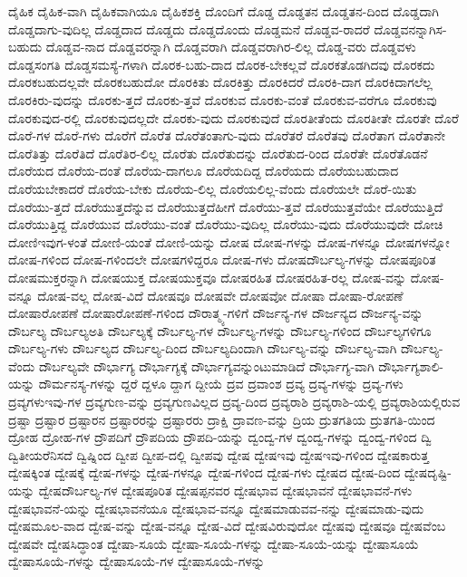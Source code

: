 {ದೈಹಿಕ
ದೈಹಿಕ-ವಾಗಿ
ದೈಹಿಕವಾಗಿಯೂ
ದೈಹಿಕಶಕ್ತಿ
ದೊಂದಿಗೆ
ದೊಡ್ಡ
ದೊಡ್ಡತನ
ದೊಡ್ಡತನ-ದಿಂದ
ದೊಡ್ಡದಾಗಿ
ದೊಡ್ಡದಾಗು-ವುದಿಲ್ಲ
ದೊಡ್ಡದಾದ
ದೊಡ್ಡದು
ದೊಡ್ಡದೊಂದು
ದೊಡ್ಡಮನೆ
ದೊಡ್ಡವ-ರಾದರೆ
ದೊಡ್ಡವನನ್ನಾಗಿಸ-ಬಹುದು
ದೊಡ್ಡವ-ನಾದ
ದೊಡ್ಡವರನ್ನಾಗಿ
ದೊಡ್ಡವರಾಗಿ
ದೊಡ್ಡವರಾಗಿರ-ಲಿಲ್ಲ
ದೊಡ್ಡ-ವರು
ದೊಡ್ಡವಳು
ದೊಡ್ಡಸಂಗತಿ
ದೊಡ್ಡಸಮಸ್ಯೆ-ಗಳಾಗಿ
ದೊರಕ-ಬಹು-ದಾದ
ದೊರಕ-ಬೇಕಲ್ಲವೆ
ದೊರಕತೊಡಗಿದವು
ದೊರಕದು
ದೊರಕಬಹುದಲ್ಲವೇ
ದೊರಕಬಹುದೋ
ದೊರಕಿತು
ದೊರಕಿತ್ತು
ದೊರಕಿದರೆ
ದೊರಕಿ-ದಾಗ
ದೊರಕಿದಾಗಲೆಲ್ಲ
ದೊರಕಿರು-ವುದನ್ನು
ದೊರಕು-ತ್ತದೆ
ದೊರಕು-ತ್ತವೆ
ದೊರಕುವ
ದೊರಕು-ವಂತೆ
ದೊರಕುವ-ವರೆಗೂ
ದೊರಕುವು
ದೊರಕುವುದ-ರಲ್ಲಿ
ದೊರಕುವುದಲ್ಲದೇ
ದೊರಕು-ವುದು
ದೊರಕುವುದೆ
ದೊರತೀತೆಂದು
ದೊರತೀತೇ
ದೊರತೇ
ದೊರೆ
ದೊರೆ-ಗಳ
ದೊರೆ-ಗಳು
ದೊರೆಗೆ
ದೊರೆತ
ದೊರೆತಂತಾಗು-ವುದು
ದೊರೆತರೆ
ದೊರೆತವು
ದೊರೆತಾಗ
ದೊರೆತಾನೇ
ದೊರೆತಿತ್ತು
ದೊರೆತಿದೆ
ದೊರೆತಿರ-ಲಿಲ್ಲ
ದೊರೆತು
ದೊರೆತುದನ್ನು
ದೊರೆತುದ-ರಿಂದ
ದೊರೆತೇ
ದೊರೆತೊಡನೆ
ದೊರೆಯದ
ದೊರೆಯ-ದಂತೆ
ದೊರೆಯ-ದಾಗಲೂ
ದೊರೆಯದಿದ್ದ
ದೊರೆಯದು
ದೊರೆಯಬಹುದಾದ
ದೊರೆಯಬೇಕಾದರೆ
ದೊರೆಯ-ಬೇಕು
ದೊರೆಯ-ಲಿಲ್ಲ
ದೊರೆಯಲಿಲ್ಲ-ವೆಂದು
ದೊರೆಯಲೇ
ದೊರೆ-ಯಿತು
ದೊರೆಯು-ತ್ತದೆ
ದೊರೆಯುತ್ತದೆನ್ನುವ
ದೊರೆಯುತ್ತದೆಹೀಗೆ
ದೊರೆಯು-ತ್ತವೆ
ದೊರೆಯುತ್ತವೆಯೇ
ದೊರೆಯುತ್ತಿದೆ
ದೊರೆಯುತ್ತಿದ್ದ
ದೊರೆಯುವ
ದೊರೆಯು-ವಂತೆ
ದೊರೆಯು-ವುದಿಲ್ಲ
ದೊರೆಯು-ವುದು
ದೊರೆಯುವುದೇ
ದೋಚಿ
ದೋಣಿಇವುಗ-ಳಂತೆ
ದೋಣಿ-ಯಂತೆ
ದೋಣಿ-ಯನ್ನು
ದೋಷ
ದೋಷ-ಗಳನ್ನು
ದೋಷ-ಗಳನ್ನೂ
ದೋಷಗಳನ್ನೋ
ದೋಷ-ಗಳಿಂದ
ದೋಷ-ಗಳಿಂದಲೇ
ದೋಷಗಳಿದ್ದರೂ
ದೋಷ-ಗಳು
ದೋಷದೌರ್ಬಲ್ಯ-ಗಳನ್ನು
ದೋಷಪೂರಿತ
ದೋಷಮುಕ್ತರನ್ನಾಗಿ
ದೋಷಯುಕ್ತ
ದೋಷಯುಕ್ತವೂ
ದೋಷರಹಿತ
ದೋಷರಹಿತ-ರಲ್ಲ
ದೋಷ-ವನ್ನು
ದೋಷ-ವನ್ನೂ
ದೋಷ-ವಲ್ಲ
ದೋಷ-ವಿದೆ
ದೋಷವೂ
ದೋಷವೇ
ದೋಷವೋ
ದೋಷಾ
ದೋಷಾ-ರೋಪಣೆ
ದೋಷಾರೋಪಣೆ
ದೋಷಾರೋಪಣೆ-ಗಳಿಂದ
ದೌರಾತ್ಮ್ಯ-ಗಳಿಗೆ
ದೌರ್ಜನ್ಯ-ಗಳ
ದೌರ್ಜನ್ಯದ
ದೌರ್ಜನ್ಯ-ವನ್ನು
ದೌರ್ಬಲ್ಯ
ದೌರ್ಬಲ್ಯಅತಿ
ದೌರ್ಬಲ್ಯಕ್ಕೆ
ದೌರ್ಬಲ್ಯ-ಗಳ
ದೌರ್ಬಲ್ಯ-ಗಳನ್ನು
ದೌರ್ಬಲ್ಯ-ಗಳಿಂದ
ದೌರ್ಬಲ್ಯಗಳಿಗೂ
ದೌರ್ಬಲ್ಯ-ಗಳು
ದೌರ್ಬಲ್ಯದ
ದೌರ್ಬಲ್ಯ-ದಿಂದ
ದೌರ್ಬಲ್ಯದಿಂದಾಗಿ
ದೌರ್ಬಲ್ಯ-ವನ್ನು
ದೌರ್ಬಲ್ಯ-ವಾಗಿ
ದೌರ್ಬಲ್ಯ-ವೆಂದು
ದೌರ್ಬಲ್ಯವೇ
ದೌರ್ಭಾಗ್ಯ
ದೌರ್ಭಾಗ್ಯಕ್ಕೆ
ದೌರ್ಭಾಗ್ಯವನ್ನುಂಟುಮಾಡಿದೆ
ದೌರ್ಭಾಗ್ಯ-ವಾಗಿ
ದೌರ್ಭಾಗ್ಯಶಾಲಿ-ಯನ್ನು
ದೌರ್ಮನಸ್ಯ-ಗಳನ್ನು
ದ್ದರೆ
ದ್ದಳೂ
ದ್ದಾಗ
ದ್ದೀಯೆ
ದ್ರವ
ದ್ರವಾಂಶ
ದ್ರವ್ಯ
ದ್ರವ್ಯ-ಗಳನ್ನು
ದ್ರವ್ಯ-ಗಳು
ದ್ರವ್ಯಗಳುಇವು-ಗಳ
ದ್ರವ್ಯಗುಣ-ವನ್ನು
ದ್ರವ್ಯಗುಣವಿಲ್ಲದ
ದ್ರವ್ಯ-ದಿಂದ
ದ್ರವ್ಯರಾಶಿ
ದ್ರವ್ಯರಾಶಿ-ಯಲ್ಲಿ
ದ್ರವ್ಯರಾಶಿಯಲ್ಲಿರುವ
ದ್ರಷ್ಟಾ
ದ್ರಷ್ಟಾರ
ದ್ರಷ್ಟಾರನ
ದ್ರಷ್ಟಾರರನ್ನು
ದ್ರಷ್ಟಾರರು
ದ್ರಾಕ್ಷಿ
ದ್ರಾವಣ-ವನ್ನು
ದ್ರಿಯ
ದ್ರುತಗತಿಯ
ದ್ರುತಗತಿ-ಯಿಂದ
ದ್ರೋಹ
ದ್ರೋಹ-ಗಳ
ದ್ರೌಪದಿಗೆ
ದ್ರೌಪದಿಯ
ದ್ರೌಪದಿ-ಯನ್ನು
ದ್ವಂದ್ವ-ಗಳ
ದ್ವಂದ್ವ-ಗಳನ್ನು
ದ್ವಂದ್ವ-ಗಳಿಂದ
ದ್ವಿ
ದ್ವಿತೀಯರೆನಿಸದೆ
ದ್ವಿಷ್ನಿಂದ
ದ್ವೀಪ
ದ್ವೀಪ-ದಲ್ಲಿ
ದ್ವೀಪವು
ದ್ವೇಷ
ದ್ವೇಷಇವು
ದ್ವೇಷಇವು-ಗಳಿಂದ
ದ್ವೇಷಕಾರುತ್ತ
ದ್ವೇಷಕ್ಕಿಂತ
ದ್ವೇಷಕ್ಕೆ
ದ್ವೇಷ-ಗಳನ್ನು
ದ್ವೇಷ-ಗಳನ್ನೂ
ದ್ವೇಷ-ಗಳಿಂದ
ದ್ವೇಷ-ಗಳು
ದ್ವೇಷದ
ದ್ವೇಷ-ದಿಂದ
ದ್ವೇಷದೃಷ್ಟಿ-ಯನ್ನು
ದ್ವೇಷದೌರ್ಬಲ್ಯ-ಗಳ
ದ್ವೇಷಪೂರಿತ
ದ್ವೇಷಪ್ಪನವರ
ದ್ವೇಷಭಾವ
ದ್ವೇಷಭಾವನೆ
ದ್ವೇಷಭಾವನೆ-ಗಳು
ದ್ವೇಷಭಾವನೆ-ಯನ್ನು
ದ್ವೇಷಭಾವನೆಯೂ
ದ್ವೇಷಭಾವ-ವನ್ನೂ
ದ್ವೇಷಮಾಡುವವ-ನನ್ನು
ದ್ವೇಷಮಾಡು-ವುದು
ದ್ವೇಷಮೂಲ-ವಾದ
ದ್ವೇಷ-ವನ್ನು
ದ್ವೇಷ-ವನ್ನೂ
ದ್ವೇಷ-ವಿದೆ
ದ್ವೇಷವಿರುವುದೋ
ದ್ವೇಷವು
ದ್ವೇಷವೂ
ದ್ವೇಷವೆಂಬ
ದ್ವೇಷವೇ
ದ್ವೇಷಸಿದ್ಧಾಂತ
ದ್ವೇಷಾ-ಸೂಯೆ
ದ್ವೇಷಾ-ಸೂಯೆ-ಗಳನ್ನು
ದ್ವೇಷಾ-ಸೂಯೆ-ಯನ್ನು
ದ್ವೇಷಾಸೂಯೆ
ದ್ವೇಷಾಸೂಯೆ-ಗಳನ್ನು
ದ್ವೇಷಾಸೂಯೆ-ಗಳ
ದ್ವೇಷಾಸೂಯೆ-ಗಳನ್ನು
}
